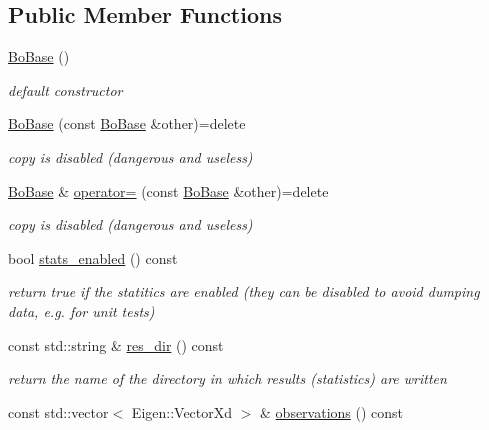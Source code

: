 \subsection*{Public Member Functions}
\begin{DoxyCompactItemize}
\item 
\hyperlink{classlimbo_1_1bayes__opt_1_1_bo_base_a1602cb9a6fa728d8181ee7ec080dd441}{Bo\+Base} ()
\begin{DoxyCompactList}\small\item\em default constructor \end{DoxyCompactList}\item 
\hyperlink{classlimbo_1_1bayes__opt_1_1_bo_base_a807db4b72b87b720303b4b56fce44899}{Bo\+Base} (const \hyperlink{classlimbo_1_1bayes__opt_1_1_bo_base}{Bo\+Base} \&other)=delete
\begin{DoxyCompactList}\small\item\em copy is disabled (dangerous and useless) \end{DoxyCompactList}\item 
\hyperlink{classlimbo_1_1bayes__opt_1_1_bo_base}{Bo\+Base} \& \hyperlink{classlimbo_1_1bayes__opt_1_1_bo_base_a91b7f3f0295d4e6e2a1263f3882817bd}{operator=} (const \hyperlink{classlimbo_1_1bayes__opt_1_1_bo_base}{Bo\+Base} \&other)=delete
\begin{DoxyCompactList}\small\item\em copy is disabled (dangerous and useless) \end{DoxyCompactList}\item 
bool \hyperlink{classlimbo_1_1bayes__opt_1_1_bo_base_a124b963cab48ee23698b3cbd2dd1e496}{stats\+\_\+enabled} () const 
\begin{DoxyCompactList}\small\item\em return true if the statitics are enabled (they can be disabled to avoid dumping data, e.\+g. for unit tests) \end{DoxyCompactList}\item 
const std\+::string \& \hyperlink{classlimbo_1_1bayes__opt_1_1_bo_base_a5f589de569a67fe5a645ee0b7fe1173c}{res\+\_\+dir} () const 
\begin{DoxyCompactList}\small\item\em return the name of the directory in which results (statistics) are written \end{DoxyCompactList}\item 
const std\+::vector$<$ Eigen\+::\+Vector\+Xd $>$ \& \hyperlink{classlimbo_1_1bayes__opt_1_1_bo_base_a1c5e2b7c9aaae38770505011dfcb61ec}{observations} () const 

\end{DoxyCompactItemize}
